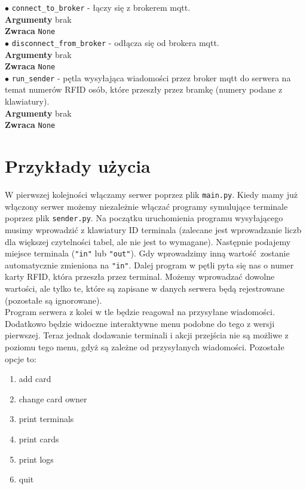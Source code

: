 \documentclass{article}
\begin{document}
$\bullet$ \texttt{connect\_to\_broker} - łączy się z brokerem mqtt. \\
\textbf{Argumenty} brak \\ \textbf{Zwraca} \texttt{None} \\

$\bullet$ \texttt{disconnect\_from\_broker} - odłącza się od 
brokera mqtt. \\
\textbf{Argumenty} brak \\ \textbf{Zwraca} \texttt{None} \\

$\bullet$ \texttt{run\_sender} - pętla wysyłająca wiadomości przez 
broker mqtt do serwera na temat numerów RFID osób, które przeszły
przez bramkę (numery podane z klawiatury). \\
\textbf{Argumenty} brak \\ \textbf{Zwraca} \texttt{None} \\

\newpage
\section{Przykłady użycia}
W pierwszej kolejności włączamy serwer poprzez plik 
\texttt{main.py}. Kiedy mamy już włączony serwer możemy niezależnie
włączać programy symulujące terminale poprzez plik \texttt{sender.py}.
Na początku uruchomienia programu wysyłającego musimy wprowadzić z 
klawiatury ID terminala (zalecane jest wprowadzanie liczb dla większej
czytelności tabel, ale nie jest to wymagane). Następnie podajemy
miejsce terminala (\texttt{"in"} lub \texttt{"out"}). Gdy wprowadzimy
inną wartość zostanie automatycznie zmieniona na \texttt{"in"}.
Dalej program w pętli pyta się nas o numer karty RFID, która przeszła
przez terminal. Możemy wprowadzać dowolne wartości, ale tylko te, 
które są zapisane w danych serwera będą rejestrowane (pozostałe są
ignorowane). \\
Program serwera z kolei w tle będzie reagował na przysyłane 
wiadomości. Dodatkowo będzie widoczne interaktywne menu
podobne do tego z wersji pierwszej. Teraz jednak dodawanie terminali
i akcji przejścia nie są możliwe z poziomu tego menu, gdyż są 
zależne od przysyłanych wiadomości. Pozostałe opcje to:

\begin{enumerate}
    \item add card
    \item change card owner
    \item print terminals
    \item print cards
    \item print logs
    \item quit
\end{enumerate}
\end{document}
